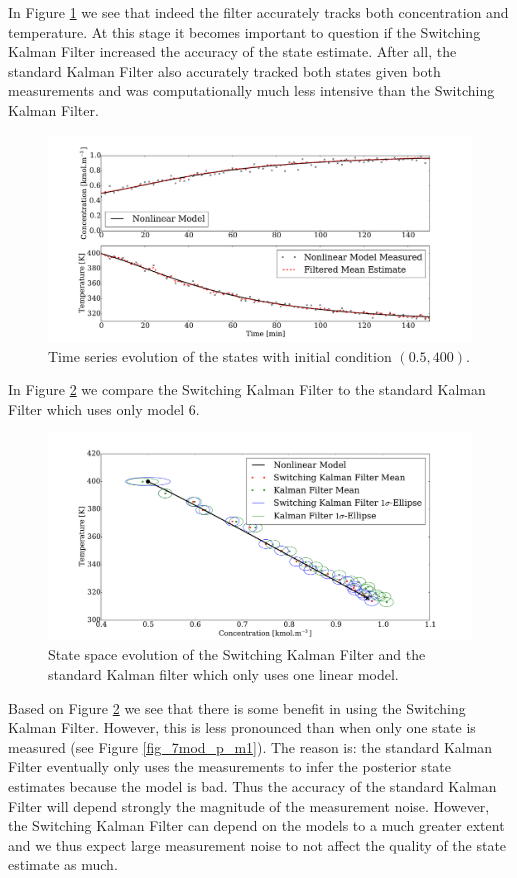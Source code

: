 \documentclass[../masters.tex]{subfiles}
\begin{document}
In Figure \ref{fig_7mod_t_m2} we see that indeed the filter accurately tracks both concentration and temperature. At this stage it becomes important to question if the Switching Kalman Filter increased the accuracy of the state estimate. After all, the standard Kalman Filter also accurately tracked both states given both measurements and was computationally much less intensive than the Switching Kalman Filter. 
\begin{figure}[H] 
\centering
\includegraphics[scale=0.3]{skf_s7_t_m2.pdf}
\caption{Time series evolution of the states with initial condition $(0.5, 400)$.}
\label{fig_7mod_t_m2}
\end{figure}
In Figure \ref{fig_7mod_p_m2} we compare the Switching Kalman Filter to the standard Kalman Filter which uses only model 6.
\begin{figure}[H] 
\centering
\includegraphics[scale=0.3]{skf_s7_p_m2.pdf}
\caption{State space evolution of the Switching Kalman Filter and the standard Kalman filter which only uses one linear model.}
\label{fig_7mod_p_m2}
\end{figure}
Based on Figure \ref{fig_7mod_p_m2} we see that there is some benefit in using the Switching Kalman Filter. However, this is less pronounced than when only one state is measured (see Figure \ref{fig_7mod_p_m1}). The reason is: the standard Kalman Filter eventually only uses the measurements to infer the posterior state estimates because the model is bad. Thus the accuracy of the standard Kalman Filter will depend strongly the magnitude of the measurement noise. However, the Switching Kalman Filter can depend on the models to a much greater extent and we thus expect large measurement noise to not affect the quality of the state estimate as much. 
\end{document}
